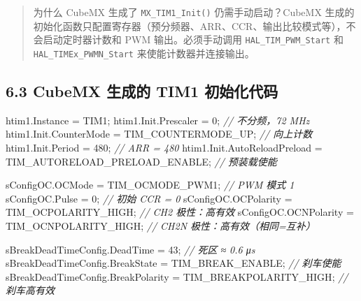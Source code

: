 \documentclass[
  chinese,
  UTF8,
  oneside,
  openany]{ctexbook}
\newenvironment{Shaded}{}{}
\newcommand{\CommentTok}[1]{\textcolor[rgb]{0.38,0.63,0.69}{\textit{#1}}}
\newcommand{\DecValTok}[1]{\textcolor[rgb]{0.25,0.63,0.44}{#1}}
\newcommand{\NormalTok}[1]{#1}
\newcommand{\OperatorTok}[1]{\textcolor[rgb]{0.40,0.40,0.40}{#1}}
\begin{document}
\begin{quote}
为什么 CubeMX 生成了 \texttt{MX\_TIM1\_Init()} 仍需手动启动？CubeMX
生成的初始化函数只配置寄存器（预分频器、ARR、CCR、输出比较模式等），不会启动定时器计数和
PWM 输出。必须手动调用 \texttt{HAL\_TIM\_PWM\_Start} 和
\texttt{HAL\_TIMEx\_PWMN\_Start} 来使能计数器并连接输出。
\end{quote}

\subsection{6.3 CubeMX 生成的 TIM1
初始化代码}\label{cubemx-ux751fux6210ux7684-tim1-ux521dux59cbux5316ux4ee3ux7801}

\begin{Shaded}
\begin{Highlighting}[]
\NormalTok{htim1}\OperatorTok{.}\NormalTok{Instance }\OperatorTok{=}\NormalTok{ TIM1}\OperatorTok{;}
\NormalTok{htim1}\OperatorTok{.}\NormalTok{Init}\OperatorTok{.}\NormalTok{Prescaler }\OperatorTok{=} \DecValTok{0}\OperatorTok{;}                          \CommentTok{// 不分频，72 MHz}
\NormalTok{htim1}\OperatorTok{.}\NormalTok{Init}\OperatorTok{.}\NormalTok{CounterMode }\OperatorTok{=}\NormalTok{ TIM\_COUNTERMODE\_UP}\OperatorTok{;}        \CommentTok{// 向上计数}
\NormalTok{htim1}\OperatorTok{.}\NormalTok{Init}\OperatorTok{.}\NormalTok{Period }\OperatorTok{=} \DecValTok{480}\OperatorTok{;}                            \CommentTok{// ARR = 480}
\NormalTok{htim1}\OperatorTok{.}\NormalTok{Init}\OperatorTok{.}\NormalTok{AutoReloadPreload }\OperatorTok{=}\NormalTok{ TIM\_AUTORELOAD\_PRELOAD\_ENABLE}\OperatorTok{;}  \CommentTok{// 预装载使能}

\NormalTok{sConfigOC}\OperatorTok{.}\NormalTok{OCMode }\OperatorTok{=}\NormalTok{ TIM\_OCMODE\_PWM1}\OperatorTok{;}                 \CommentTok{// PWM 模式 1}
\NormalTok{sConfigOC}\OperatorTok{.}\NormalTok{Pulse }\OperatorTok{=} \DecValTok{0}\OperatorTok{;}                                \CommentTok{// 初始 CCR = 0}
\NormalTok{sConfigOC}\OperatorTok{.}\NormalTok{OCPolarity }\OperatorTok{=}\NormalTok{ TIM\_OCPOLARITY\_HIGH}\OperatorTok{;}          \CommentTok{// CH2 极性：高有效}
\NormalTok{sConfigOC}\OperatorTok{.}\NormalTok{OCNPolarity }\OperatorTok{=}\NormalTok{ TIM\_OCNPOLARITY\_HIGH}\OperatorTok{;}        \CommentTok{// CH2N 极性：高有效（相同=互补）}

\NormalTok{sBreakDeadTimeConfig}\OperatorTok{.}\NormalTok{DeadTime }\OperatorTok{=} \DecValTok{43}\OperatorTok{;}                  \CommentTok{// 死区 ≈ 0.6 μs}
\NormalTok{sBreakDeadTimeConfig}\OperatorTok{.}\NormalTok{BreakState }\OperatorTok{=}\NormalTok{ TIM\_BREAK\_ENABLE}\OperatorTok{;}  \CommentTok{// 刹车使能}
\NormalTok{sBreakDeadTimeConfig}\OperatorTok{.}\NormalTok{BreakPolarity }\OperatorTok{=}\NormalTok{ TIM\_BREAKPOLARITY\_HIGH}\OperatorTok{;}  \CommentTok{// 刹车高有效}
\end{Highlighting}
\end{Shaded}
\end{document}
